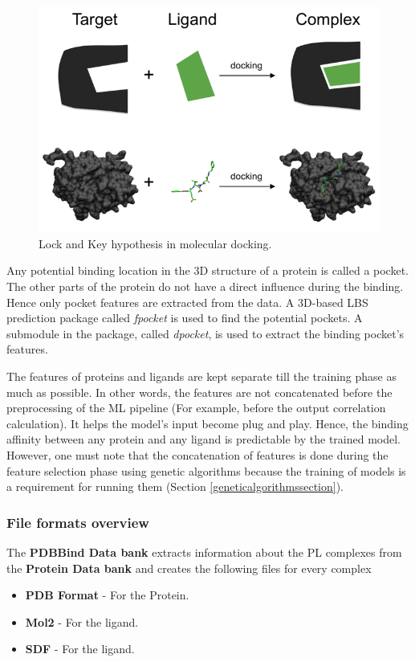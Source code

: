 \documentclass[11pt]{article}
\begin{document}
\begin{figure}[htb]
  \centering
    \includegraphics[scale=0.7]{images/lock_and_key}
    \caption{Lock and Key hypothesis in molecular docking.  \cite{lockandkeyformatpng}}
    \label{fig:lockandkey}
\end{figure}

Any potential binding location in the 3D structure of a protein is called a pocket. The other parts of the protein do not have a direct influence during the binding. Hence only pocket features are extracted from the data.
A 3D-based LBS prediction package called \textit{fpocket} is used to find the potential pockets.
A submodule in the package, called \textit{dpocket}, is used to extract the binding pocket's features.

The features of proteins and ligands are kept separate till the training phase as much as possible.
In other words, the features are not concatenated before the preprocessing of the ML pipeline (For example, before the output correlation calculation).
It helps the model's input become plug and play.
Hence, the binding affinity between any protein and any ligand is predictable by the trained model.
However, one must note that the concatenation of features is done during the feature selection phase using genetic algorithms because the training of models is a requirement for running them (Section \ref{geneticalgorithmssection}).



\subsubsection{File formats overview}
The \textbf{PDBBind Data bank} extracts information about the PL complexes from the \textbf{Protein Data bank} and creates the following files for every complex
\begin{itemize}
\item \textbf{PDB Format} - For the Protein.
\item  \textbf{Mol2} - For the ligand.
\item \textbf{SDF} - For the ligand.
\end{itemize}
\end{document}
